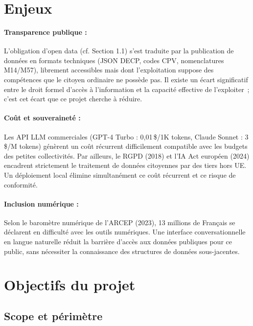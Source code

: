 \section{Enjeux}

\paragraph{Transparence publique :}
L'obligation d'open data (cf. Section 1.1) s'est traduite par la publication de données en formats techniques (JSON DECP, codes CPV, nomenclatures M14/M57), librement accessibles mais dont l'exploitation suppose des compétences que le citoyen ordinaire ne possède pas. Il existe un écart significatif entre le droit formel d'accès à l'information et la capacité effective de l'exploiter~; c'est cet écart que ce projet cherche à réduire.

\paragraph{Coût et souveraineté :}
Les API LLM commerciales (GPT-4 Turbo : 0,01\,\$/1K tokens, Claude Sonnet : 3\,\$/M tokens) génèrent un coût récurrent difficilement compatible avec les budgets des petites collectivités. Par ailleurs, le RGPD (2018) et l'IA Act européen (2024) encadrent strictement le traitement de données citoyennes par des tiers hors UE. Un déploiement local élimine simultanément ce coût récurrent et ce risque de conformité.

\paragraph{Inclusion numérique :}
Selon le baromètre numérique de l'ARCEP (2023), 13 millions de Français se déclarent en difficulté avec les outils numériques. Une interface conversationnelle en langue naturelle réduit la barrière d'accès aux données publiques pour ce public, sans nécessiter la connaissance des structures de données sous-jacentes.

\section{Objectifs du projet}

\subsection{Scope et périmètre}

